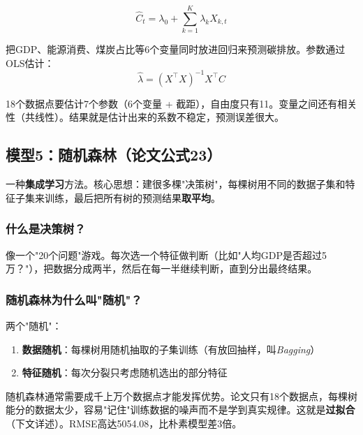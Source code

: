 \documentclass[12pt, a4paper]{article}
\begin{document}
\[
\hat{C}_t = \lambda_0 + \sum_{k=1}^{K} \lambda_k X_{k,t}
\]

把GDP、能源消费、煤炭占比等6个变量同时放进回归来预测碳排放。参数通过OLS估计：
\[
\hat{\lambda} = (X^\top X)^{-1} X^\top C
\]

\begin{warningbox}[为什么表现不好？]
18个数据点要估计7个参数（6个变量 + 截距），自由度只有11。变量之间还有相关性（共线性）。结果就是估计出来的系数不稳定，预测误差很大。
\end{warningbox}

\subsection{模型5：随机森林（论文公式23）}

\begin{conceptbox}[随机森林]
一种\textbf{集成学习}方法。核心思想：建很多棵"决策树"，每棵树用不同的数据子集和特征子集来训练，最后把所有树的预测结果\textbf{取平均}。
\end{conceptbox}

\subsubsection{什么是决策树？}

\begin{conceptbox}[决策树]
像一个"20个问题"游戏。每次选一个特征做判断（比如"人均GDP是否超过5万？"），把数据分成两半，然后在每一半继续判断，直到分出最终结果。
\end{conceptbox}

\subsubsection{随机森林为什么叫"随机"？}
两个"随机"：
\begin{enumerate}[leftmargin=2em]
\item \textbf{数据随机}：每棵树用随机抽取的子集训练（有放回抽样，叫\textit{Bagging}）
\item \textbf{特征随机}：每次分裂只考虑随机选出的部分特征
\end{enumerate}

\begin{warningbox}[论文中随机森林为什么崩了？]
随机森林通常需要成千上万个数据点才能发挥优势。论文只有18个数据点，每棵树能分的数据太少，容易"记住"训练数据的噪声而不是学到真实规律。这就是\textbf{过拟合}（下文详述）。RMSE高达5054.08，比朴素模型差3倍。
\end{warningbox}
\end{document}
